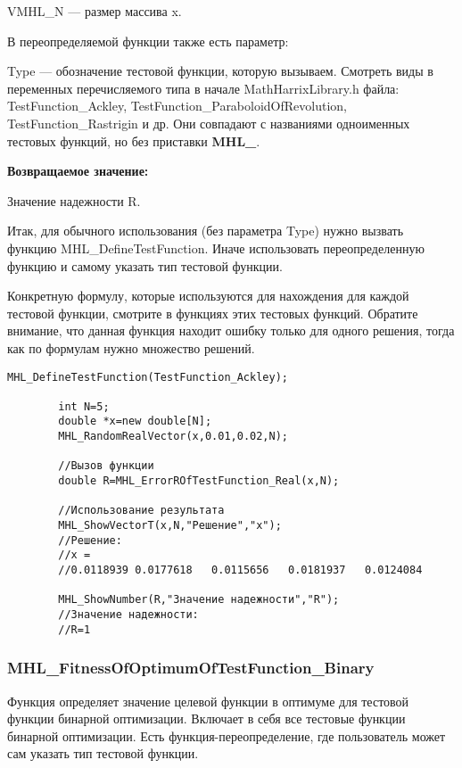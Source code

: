 \documentclass[a4paper,12pt]{article}
\begin{document}
VMHL\_N --- размер массива x.

В переопределяемой функции также есть параметр:
  
Type --- обозначение тестовой функции, которую вызываем.
Смотреть виды в переменных перечисляемого типа в начале MathHarrixLibrary.h файла: TestFunction\_Ackley, TestFunction\_ParaboloidOfRevolution, TestFunction\_Rastrigin и др. Они совпадают с названиями одноименных тестовых функций, но без приставки \textbf{MHL\_}.

\textbf{Возвращаемое значение:}
 
Значение надежности R.

Итак, для обычного использования (без параметра Type) нужно вызвать функцию MHL\_DefineTestFunction. Иначе использовать переопределенную функцию и самому указать тип тестовой функции.

Конкретную формулу, которые используются для нахождения для каждой тестовой функции, смотрите в функциях этих тестовых функций. Обратите внимание, что данная функция находит ошибку только для одного решения, тогда как по формулам нужно множество решений.


\begin{lstlisting}[label=code_use_MHL_ErrorROfTestFunction_Real,caption=Пример использования]
        MHL_DefineTestFunction(TestFunction_Ackley);

        int N=5;
        double *x=new double[N];
        MHL_RandomRealVector(x,0.01,0.02,N);

        //Вызов функции
        double R=MHL_ErrorROfTestFunction_Real(x,N);

        //Использование результата
        MHL_ShowVectorT(x,N,"Решение","x");
        //Решение:
        //x =
        //0.0118939	0.0177618	0.0115656	0.0181937	0.0124084

        MHL_ShowNumber(R,"Значение надежности","R");
        //Значение надежности:
        //R=1
\end{lstlisting}

\subsubsection{MHL\_FitnessOfOptimumOfTestFunction\_Binary}\label{MHL_FitnessOfOptimumOfTestFunction_Binary}

Функция определяет значение целевой функции в оптимуме для тестовой функции бинарной оптимизации. Включает в себя все тестовые функции бинарной оптимизации. Есть функция-переопределение, где пользователь может сам указать тип тестовой функции.
\end{document}
